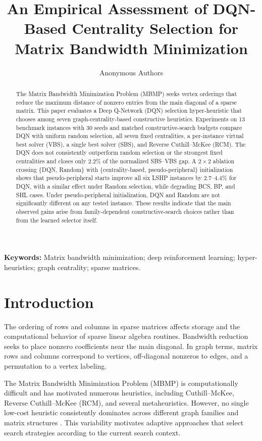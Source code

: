 \documentclass[runningheads]{llncs}
\title{An Empirical Assessment of DQN-Based Centrality Selection for Matrix Bandwidth Minimization}
\author{Anonymous Authors}
\date{}
\begin{document}
\maketitle

\begin{abstract}
The Matrix Bandwidth Minimization Problem (MBMP) seeks vertex orderings that reduce the maximum distance of nonzero entries from the main diagonal of a sparse matrix. This paper evaluates a Deep Q-Network (DQN) selection hyper-heuristic that chooses among seven graph-centrality-based constructive heuristics. Experiments on 13 benchmark instances with 30 seeds and matched constructive-search budgets compare DQN with uniform random selection, all seven fixed centralities, a per-instance virtual best solver (VBS), a single best solver (SBS), and Reverse Cuthill--McKee (RCM). The DQN does not consistently outperform random selection or the strongest fixed centralities and closes only 2.2\% of the normalized SBS--VBS gap. A $2\times2$ ablation crossing \{DQN, Random\} with \{centrality-based, pseudo-peripheral\} initialization shows that pseudo-peripheral starts improve all six LSHP instances by 2.7--4.4\% for DQN, with a similar effect under Random selection, while degrading BCS, BP, and SHL cases. Under pseudo-peripheral initialization, DQN and Random are not significantly different on any tested instance. These results indicate that the main observed gains arise from family-dependent constructive-search choices rather than from the learned selector itself.
\end{abstract}

\noindent\textbf{Keywords:} Matrix bandwidth minimization; deep reinforcement learning; hyper-heuristics; graph centrality; sparse matrices.
\section{Introduction}

The ordering of rows and columns in sparse matrices affects storage and the computational behavior of sparse linear algebra routines. Bandwidth reduction seeks to place nonzero coefficients near the main diagonal. In graph terms, matrix rows and columns correspond to vertices, off-diagonal nonzeros to edges, and a permutation to a vertex labeling.

The Matrix Bandwidth Minimization Problem (MBMP) is computationally difficult and has motivated numerous heuristics, including Cuthill--McKee, Reverse Cuthill--McKee (RCM), and several metaheuristics. However, no single low-cost heuristic consistently dominates across different graph families and matrix structures \cite{gonzaga2025}. This variability motivates adaptive approaches that select search strategies according to the current search context.
\end{document}
